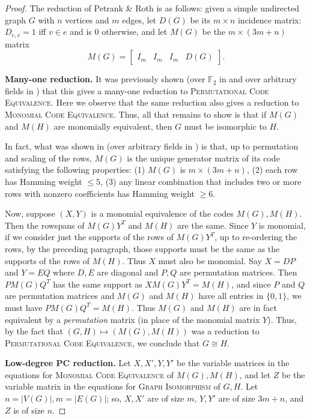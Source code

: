 \documentclass[10pt,a4paper]{article}
\theoremstyle{definition}
\newcommand{\F}{\mathbb{F}}
\begin{document}
\begin{proof}
The reduction of Petrank \& Roth is as follows: given a simple undirected graph $G$ with $n$ vertices and $m$ edges, let $D(G)$ be its $m \times n$ incidence matrix: $D_{e,v} = 1$ iff $v \in e$ and is 0 otherwise, and let $M(G)$ be the $m \times (3m + n)$ matrix 
\[
M(G) = \left[
\begin{array}{c|c|c|c}
I_m & I_m & I_m & D(G)
\end{array}
\right].
\]

\textbf{Many-one reduction.} It was previously shown (over $\F_2$ in \cite{PR} and over arbitrary fields in \cite[Lem.~II.4]{GrochowLie}) that this gives a many-one reduction to \textsc{Permutational Code Equivalence}. Here we observe that the same reduction also gives a reduction to \textsc{Monomial Code Equivalence}. Thus, all that remains to show is that if $M(G)$ and $M(H)$ are monomially equivalent, then $G$ must be isomorphic to $H$. 

In fact, what was shown in \cite{PR} (over arbitrary fields in \cite{GrochowLie}) is that, up to permutation and scaling of the rows, $M(G)$ is the unique generator matrix of its code satisfying the following properties: (1) $M(G)$ is $m \times (3m+n)$, (2) each row has Hamming weight $\leq 5$, (3) any linear combination that includes two or more rows with nonzero coefficients has Hamming weight $\geq 6$. 

Now, suppose $(X,Y)$ is a monomial equivalence of the codes $M(G), M(H)$. Then the rowspans of $M(G) Y^T$ and $M(H)$ are the same. Since $Y$ is monomial, if we consider just the supports of the rows of $M(G) Y^T$, up to re-ordering the rows, by the preceding paragraph, those supports must be the same as the supports of the rows of $M(H)$. Thus $X$ must also be monomial. Say $X = DP$ and $Y=EQ$ where $D,E$ are diagonal and $P,Q$ are permutation matrices. Then $P M(G) Q^T$ has the same support as $X M(G) Y^T = M(H)$, and since $P$ and $Q$ are permutation matrices and $M(G)$ and $M(H)$ have all entries in $\{0,1\}$, we must have $P M(G) Q^T = M(H)$. Thus $M(G)$ and $M(H)$ are in fact equivalent by a \emph{permutation} matrix (in place of the monomial matrix $Y$). Thus, by the fact that $(G,H) \mapsto (M(G), M(H))$ was a reduction to \textsc{Permutational Code Equivalence}, we conclude that $G \cong H$.


\textbf{Low-degree PC reduction.} Let $X,X',Y,Y'$ be the variable matrices in the equations for \textsc{Monomial Code Equivalence} of $M(G), M(H)$, and let $Z$ be the variable matrix in the equations for \textsc{Graph Isomorphism} of $G,H$. Let $n = |V(G)|, m = |E(G)|$; so, $X,X'$ are of size $m$, $Y,Y'$ are of size $3m+n$, and $Z$ is of size $n$. 


\end{proof}
\end{document}
